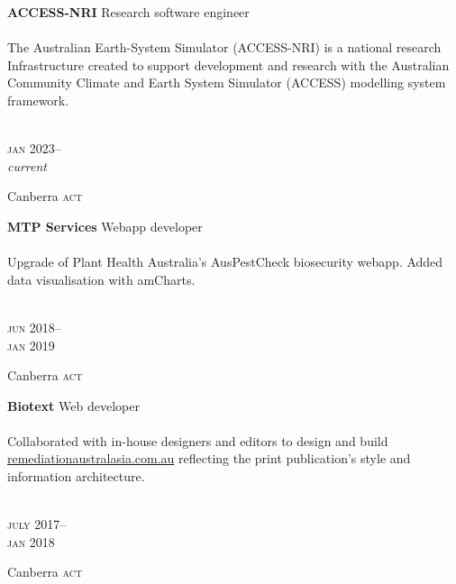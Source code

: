 \begin{minipage}[t]{\mainboxwidth\textwidth}
\textbf{ACCESS-NRI}\phantom{..} Research software engineer\\
\\
{\small The Australian Earth-System Simulator (ACCESS-NRI) is a national
research Infrastructure created to support development and research with the
Australian Community Climate and Earth System Simulator (ACCESS) modelling
system framework.}
\\
\\
{\small
\par}
\end{minipage}
\begin{minipage}[t]{\detailboxwidth\textwidth}
{
\hfill \textsc{jan} 2023--\\ 
\hspace*{0pt} \hfill \textit{current}
\par
{\small\hfill Canberra \textsc{act}}
}
\end{minipage}

\begin{minipage}[t]{\mainboxwidth\textwidth}
\textbf{MTP Services}\phantom{..} Webapp developer\\
\\
{\small
Upgrade of Plant Health Australia's AusPestCheck biosecurity webapp. Added 
data visualisation with amCharts.}
\\
\\
{\small
\par}
\end{minipage}
\begin{minipage}[t]{\detailboxwidth\textwidth}
{
\hfill \textsc{jun} 2018--\\ 
\hspace*{0pt} \hfill \textsc{jan} 2019
\par
{\small\hfill Canberra \textsc{act}}
}
\end{minipage}

\begin{minipage}[t]{\mainboxwidth\textwidth}
\textbf{Biotext}\phantom{..} Web developer\\
\\
{\small
Collaborated with in-house designers and editors to design and build 
\href{https://www.remediationaustralasia.com.au/}{remediationaustralasia.com.au} 
reflecting the print publication's style and information architecture.
}
\\
\\
{\small
\par}
\end{minipage}
\begin{minipage}[t]{\detailboxwidth\textwidth}
{
\hfill \textsc{july} 2017--\\ 
\hspace*{0pt} \hfill \textsc{jan} 2018
\par
{\small\hfill Canberra \textsc{act}}
}
\end{minipage}

